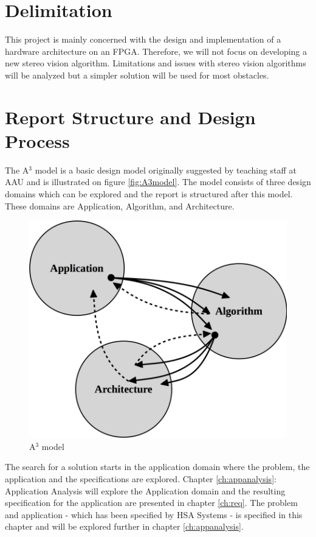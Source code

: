 \section{Delimitation}
This project is mainly concerned with the design and implementation of a hardware architecture on an FPGA. Therefore, we will not focus on developing a new stereo vision algorithm. Limitations and issues with stereo vision algorithms will be analyzed but a simpler solution will be used for most obstacles.

\section{Report Structure and Design Process}\label{sec:a3model}
The A$^3$ model is a basic design model originally suggested by teaching staff at AAU and is illustrated on figure \vref{fig:A3model}. The model consists of three design domains which can be explored and the report is structured after this model. These domains are Application, Algorithm, and Architecture.\\
\begin{figure}[ht!]
  \centering
  \includegraphics[scale=0.25]{figures/A3model.jpg}
  \caption{A$^3$ model}
  \label{fig:A3model}
\end{figure}

The search for a solution starts in the application domain where the problem, the application and the specifications are explored. Chapter \vref{ch:appanalysis}: Application Analysis will explore the Application domain and the resulting specification for the application are presented in chapter \vref{ch:req}. The problem and application - which has been specified by HSA Systems - is specified in this chapter and will be explored further in chapter \vref{ch:appanalysis}.\\

